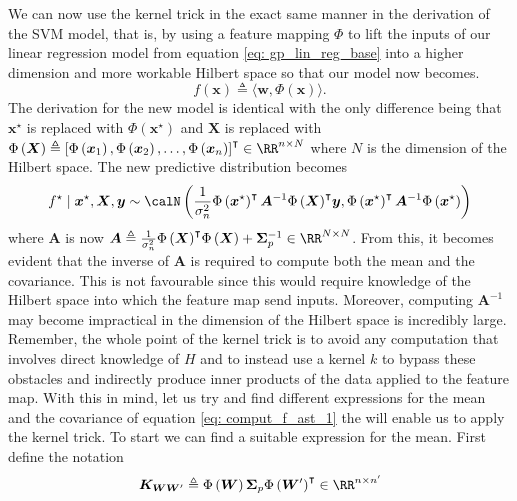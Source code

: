 We can now use the kernel trick in the exact same manner in the derivation of the SVM model, that is, by using a feature mapping $\Phi$ to lift the inputs of our linear regression model from equation \ref{eq: gp_lin_reg_base} into a higher dimension and more workable Hilbert space so that our model now becomes.
\begin{equation*} \label{eq: gp_lin_reg_feat_map}
    f \left( \bm{x} \right) \triangleq \langle \bm{w} , \Phi \left( \bm{x} \right) \rangle.
\end{equation*}
The derivation for the new model is identical with the only difference being that $\bm{x}^{\star}$ is replaced with $\Phi \left( \bm{x}^{\star} \right)$ and $\bm{X}$ is replaced with $\Phi \left( \bm{X} \right) \triangleq \left[ \Phi \left( \bm{x}_1 \right), \Phi \left( \bm{x}_2 \right) , \ldots , \Phi \left( \bm{x}_n \right) \right]^{\intercal} \in \RR^{n \times N}$ where $N$ is the dimension of the Hilbert space. The new predictive distribution becomes
\begin{equation} \label{eq: comput_f_ast_1}
    f^{\star} \mid \bm{x}^{\star} , \bm{X} , \bm{y} \sim \calN \left( \frac{1}{\sigma_n^2} \Phi \left( \bm{x}^{\star} \right)^{\intercal} \bm{A}^{-1} {\Phi \left( \bm{X} \right)}^{\intercal} \bm{y} , \Phi \left( \bm{x}^{\star} \right)^{\intercal} \bm{A}^{-1} \Phi \left( \bm{x}^{\star} \right) \right)
\end{equation}
where $\bm{A}$ is now $\bm{A} \triangleq \frac{1}{\sigma_n^2} {\Phi \left( \bm{X} \right)}^{\intercal} \Phi \left( \bm{X} \right) + \bm{\Sigma}_p^{-1} \in \RR^{N \times N}$. From this, it becomes evident that the inverse of $\bm{A}$ is required to compute both the mean and the covariance. This is not favourable since this would require knowledge of the Hilbert space into which the feature map send inputs. Moreover, computing $\bm{A}^{-1}$ may become impractical in the dimension of the Hilbert space is incredibly large. Remember, the whole point of the kernel trick is to avoid any computation that involves direct knowledge of $H$ and to instead use a kernel $k$ to bypass these obstacles and indirectly produce inner products of the data applied to the feature map. With this in mind, let us try and find different expressions for the mean and the covariance of equation \ref{eq: comput_f_ast_1} the will enable us to apply the kernel trick. To start we can find a suitable expression for the mean. First define the notation
\[
    \bm{K}_{\bm{W} \bm{W}'} \triangleq \Phi \left( \bm{W} \right) \bm{\Sigma}_p {\Phi \left( \bm{W}' \right)}^{\intercal} \in \RR^{n \times n'}
\]
